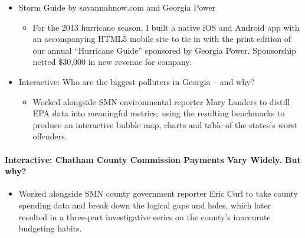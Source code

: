 \documentclass{article}
\begin{document}
\begin{itemize}[noitemsep,topsep=\mdcompacttopsep]
\item{}Storm Guide by savannahnow.com and Georgia Power

\begin{itemize}[noitemsep,topsep=\mdcompacttopsep]%

\item{}For the 2013 hurricane season, I built a native iOS and Android app with an accompanying HTML5 mobile site to tie in with the print edition of our annual “Hurricane Guide” sponsored by Georgia Power. Sponsorship netted \$30,000 in new revenue for company.%
\end{itemize}%

\item{}Interactive: Who are the biggest polluters in Georgia – and why?

\begin{itemize}[noitemsep,topsep=\mdcompacttopsep]%

\item{}Worked alongside SMN environmental reporter Mary Landers to distill EPA data into meaningful metrics, using the resulting benchmarks to produce an interactive bubble map, charts and table of the states's worst offenders.%
\end{itemize}%
\end{itemize}%

\paragraph{Interactive: Chatham County Commission Payments Vary Widely. But why?}\label{sec-interactive--chatham-county-commission-payments-vary-widely-but-why}%

\begin{itemize}[noitemsep,topsep=\mdcompacttopsep]%

\item{}Worked alongside SMN county government reporter Eric Curl to take county spending data and break down the logical gaps and holes, which later resulted in a three-part investigative series on the county's inaccurate budgeting habits.%
\end{itemize}%
\end{document}
